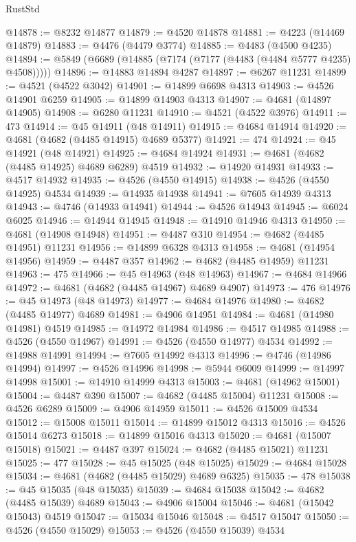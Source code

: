\begin{lexlean}{RustStd}
\begin{coremodule}
@14878 := @8232 @14877
@14879 := @4520 @14878
@14881 := @4223 (@14469 @14879)
@14883 := @4476 (@4479 @3774)
@14885 := @4483 (@4500 @4235)
@14894 := @5849 (@6689 (@14885 (@7174 (@7177 (@4483 (@4484 @5777 @4235) @4508)))))
@14896 := @14883 @14894 @4287
@14897 := @6267 @11231
@14899 := @4521 (@4522 @3042)
@14901 := @14899 @6698 @4313
@14903 := @4526 @14901 @6259
@14905 := @14899 @14903 @4313
@14907 := @4681 (@14897 @14905)
@14908 := @6280 @11231
@14910 := @4521 (@4522 @3976)
@14911 := 473
@14914 := @45 @14911 (@48 @14911)
@14915 := @4684 @14914
@14920 := @4681 (@4682 (@4485 @14915) @4689 @5377)
@14921 := 474
@14924 := @45 @14921 (@48 @14921)
@14925 := @4684 @14924
@14931 := @4681 (@4682 (@4485 @14925) @4689 @6289) @4519
@14932 := @14920 @14931
@14933 := @4517 @14932
@14935 := @4526 (@4550 @14915)
@14938 := @4526 (@4550 @14925) @4534
@14939 := @14935 @14938
@14941 := @7605 @14939 @4313
@14943 := @4746 (@14933 @14941)
@14944 := @4526 @14943
@14945 := @6024 @6025
@14946 := @14944 @14945
@14948 := @14910 @14946 @4313
@14950 := @4681 (@14908 @14948)
@14951 := @4487 @310
@14954 := @4682 (@4485 @14951) @11231
@14956 := @14899 @6328 @4313
@14958 := @4681 (@14954 @14956)
@14959 := @4487 @357
@14962 := @4682 (@4485 @14959) @11231
@14963 := 475
@14966 := @45 @14963 (@48 @14963)
@14967 := @4684 @14966
@14972 := @4681 (@4682 (@4485 @14967) @4689 @4907)
@14973 := 476
@14976 := @45 @14973 (@48 @14973)
@14977 := @4684 @14976
@14980 := @4682 (@4485 @14977) @4689
@14981 := @4906 @14951
@14984 := @4681 (@14980 @14981) @4519
@14985 := @14972 @14984
@14986 := @4517 @14985
@14988 := @4526 (@4550 @14967)
@14991 := @4526 (@4550 @14977) @4534
@14992 := @14988 @14991
@14994 := @7605 @14992 @4313
@14996 := @4746 (@14986 @14994)
@14997 := @4526 @14996
@14998 := @5944 @6009
@14999 := @14997 @14998
@15001 := @14910 @14999 @4313
@15003 := @4681 (@14962 @15001)
@15004 := @4487 @390
@15007 := @4682 (@4485 @15004) @11231
@15008 := @4526 @6289
@15009 := @4906 @14959
@15011 := @4526 @15009 @4534
@15012 := @15008 @15011
@15014 := @14899 @15012 @4313
@15016 := @4526 @15014 @6273
@15018 := @14899 @15016 @4313
@15020 := @4681 (@15007 @15018)
@15021 := @4487 @397
@15024 := @4682 (@4485 @15021) @11231
@15025 := 477
@15028 := @45 @15025 (@48 @15025)
@15029 := @4684 @15028
@15034 := @4681 (@4682 (@4485 @15029) @4689 @6325)
@15035 := 478
@15038 := @45 @15035 (@48 @15035)
@15039 := @4684 @15038
@15042 := @4682 (@4485 @15039) @4689
@15043 := @4906 @15004
@15046 := @4681 (@15042 @15043) @4519
@15047 := @15034 @15046
@15048 := @4517 @15047
@15050 := @4526 (@4550 @15029)
@15053 := @4526 (@4550 @15039) @4534

\end{coremodule}
\end{lexlean}
